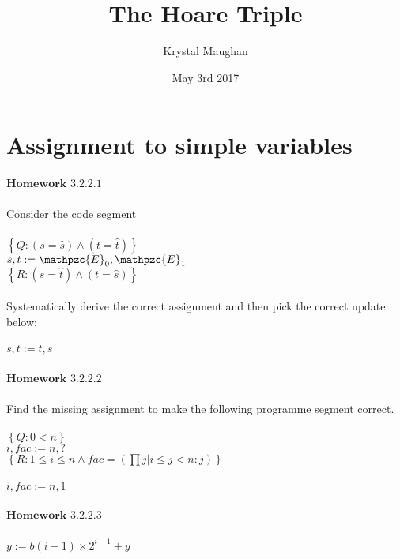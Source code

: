 \documentclass{article}
\title{The Hoare Triple}
\author{Krystal Maughan }
\date{May 3rd 2017}
\begin{document}
\maketitle

\section{Assignment to simple variables}
$\mathbf{Homework}$  $\mathbf{3.2.2.1}$
\\
\\
Consider the code segment
\\
\\
$\left\{Q : (s = \hat{s}) \land (t = \hat{t})\right\}$
\\
$s, t : = \mathpzc{E}_{0}, \mathpzc{E}_{1}$
\\
$\left\{R : (s = \hat{t}) \land (t = \hat{s})\right\}$
\\
\\
Systematically derive the correct assignment and then pick the correct update below:
\\
\\
$s, t := t, s$
\\
\\
$\mathbf{Homework}$  $\mathbf{3.2.2.2}$
\\
\\
Find the missing assignment to make the following programme segment correct.
\\
\\
$\left\{Q : 0 < n\right\}$
\\
$i, fac := n, ?$
\\
$\left\{R : 1 \leq i \leq n \land fac = (\prod j | i \leq j < n : j)\right\}$
\\
\\
$i, fac := n, 1$
\\
\\
$\mathbf{Homework}$  $\mathbf{3.2.2.3}$
\\
\\
$y := b(i - 1) \times 2^{i - 1} + y$
\end{document}
